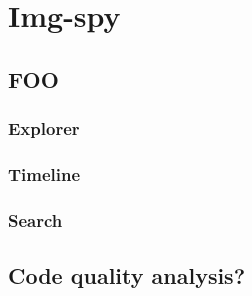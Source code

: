 \chapter{Img-spy}

\section{FOO}

\subsection{Explorer}

\subsection{Timeline}

\subsection{Search}

\section{Code quality analysis?}
